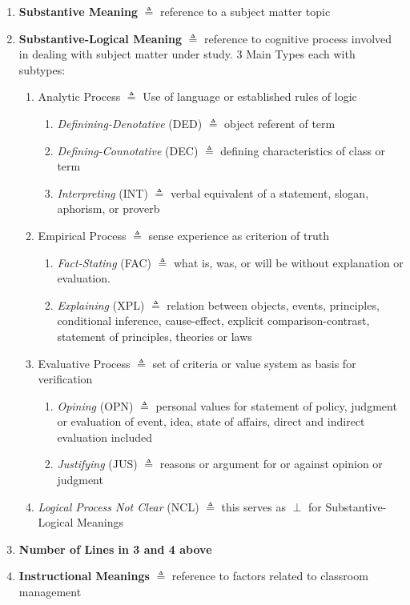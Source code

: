 \documentclass[10pt, letterpaper]{article}
\begin{document}
\begin{itemize}
\begin{enumerate}
\item \textbf{Substantive Meaning} \(\triangleq\) reference to a subject matter topic
\item \textbf{Substantive-Logical Meaning} \(\triangleq\) reference to cognitive process involved in dealing with subject matter under study. 3 Main Types each with subtypes:
\begin{enumerate}
\item Analytic Process \(\triangleq\) Use of language or established rules of logic
\begin{enumerate}
\item \emph{Definining-Denotative} (DED) \(\triangleq\) object referent of term
\item \emph{Defining-Connotative} (DEC) \(\triangleq\) defining characteristics of class or term
\item \emph{Interpreting} (INT) \(\triangleq\) verbal equivalent of a statement, slogan, aphorism, or proverb
\end{enumerate}
\item Empirical Process \(\triangleq\) sense experience as criterion of truth
\begin{enumerate}
\item \emph{Fact-Stating} (FAC) \(\triangleq\) what is, was, or will be without explanation or evaluation.
\item \emph{Explaining} (XPL) \(\triangleq\) relation between objects, events, principles, conditional inference, cause-effect, explicit comparison-contrast, statement of principles, theories or laws
\end{enumerate}
\item Evaluative Process \(\triangleq\) set of criteria or value system as basis for verification
\begin{enumerate}
\item \emph{Opining} (OPN) \(\triangleq\) personal values for statement of policy, judgment or evaluation of event, idea, state of affairs, direct and indirect evaluation included
\item \emph{Justifying} (JUS) \(\triangleq\) reasons or argument for or against opinion or judgment
\end{enumerate}
\item \emph{Logical Process Not Clear} (NCL) \(\triangleq\) this serves as \(\perp\) for Substantive-Logical Meanings
\end{enumerate}
\item \textbf{Number of Lines in 3 and 4 above}
\item \textbf{Instructional Meanings} \(\triangleq\) reference to factors related to classroom management

\end{enumerate}
\end{itemize}
\end{document}
